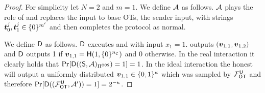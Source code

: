 


\begin{proof}\label{proof:Attack_BadT0}
	For simplicity let $N=2$ and $m=1$. We define $\Adv$ as follows. $\Adv$ plays the role of \rec and replaces the input to base OTs, the sender input, with strings $\tt_0^j,\tt_1^j\in \{0\}^{m'}$ and then completes the protocol as normal.
	
	We define $\D$ as follows. $\D$ executes \send and \Adv with input $x_1=1$. \send outputs $(\vv_{1,1},\vv_{1,2})$ and $\D$ outputs 1 if $\vv_{1,1}=\H(1, \{0\}^\nc)$ and 0 otherwise. In the real interaction it clearly holds that $\Pr[\D((\send, \Adv)_{\Pi^{\textsf{OOS}}})=1]=1$. In the ideal interaction the honest \send will output a uniformly distributed $\vv_{1,1}\in\{0,1\}^\kappa$ which was sampled by $\OOT^{\U}$ and therefore $\Pr[\D((\OOT^{\U}, \Adv'))=1]=2^{-\kappa}$.
	\pe
\end{proof}